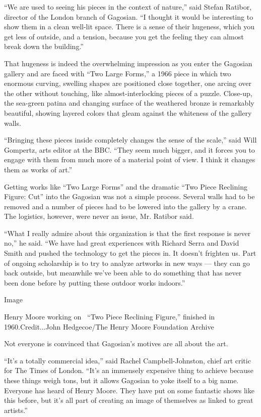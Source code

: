 ``We are used to seeing his pieces in the context of nature,'' said
Stefan Ratibor, director of the London branch of Gagosian. ``I thought
it would be interesting to show them in a clean well-lit space. There is
a sense of their hugeness, which you get less of outside, and a tension,
because you get the feeling they can almost break down the building.''

That hugeness is indeed the overwhelming impression as you enter the
Gagosian gallery and are faced with ``Two Large Forms,'' a 1966 piece in
which two enormous curving, swelling shapes are positioned close
together, one arcing over the other without touching, like
almost-interlocking pieces of a puzzle. Close-up, the sea-green patina
and changing surface of the weathered bronze is remarkably beautiful,
showing layered colors that gleam against the whiteness of the gallery
walls.

``Bringing these pieces inside completely changes the sense of the
scale,'' said Will Gompertz, arts editor at the BBC. ``They seem much
bigger, and it forces you to engage with them from much more of a
material point of view. I think it changes them as works of art.''

Getting works like ``Two Large Forms'' and the dramatic ``Two Piece
Reclining Figure: Cut'' into the Gagosian was not a simple process.
Several walls had to be removed and a number of pieces had to be lowered
into the gallery by a crane. The logistics, however, were never an
issue, Mr. Ratibor said.

``What I really admire about this organization is that the first
response is never no,'' he said. ``We have had great experiences with
Richard Serra and David Smith and pushed the technology to get the
pieces in. It doesn't frighten us. Part of ongoing scholarship is to try
to analyze artworks in new ways --- they can go back outside, but
meanwhile we've been able to do something that has never been done
before by putting these outdoor works indoors.''

Image

Henry Moore working on~ ``Two Piece Reclining Figure,'' finished in
1960.Credit...John Hedgecoe/The Henry Moore Foundation Archive

Not everyone is convinced that Gagosian's motives are all about the art.

``It's a totally commercial idea,'' said Rachel Campbell-Johnston, chief
art critic for The Times of London. ``It's an immensely expensive thing
to achieve because these things weigh tons, but it allows Gagosian to
yoke itself to a big name. Everyone has heard of Henry Moore. They have
put on some fantastic shows like this before, but it's all part of
creating an image of themselves as linked to great artists.''

